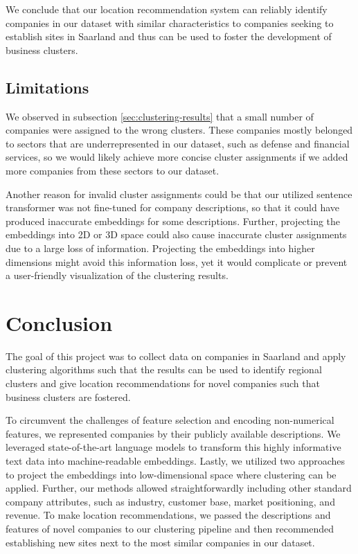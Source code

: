 \documentclass[conference]{IEEEtran}
\begin{document}
We conclude that our location recommendation system can reliably identify companies in our dataset with similar characteristics to companies seeking to establish sites in Saarland and thus can be used to foster the development of business clusters.

\subsection{Limitations}
We observed in subsection \ref{sec:clustering-results} that a small number of companies were assigned to the wrong clusters. These companies mostly belonged to sectors that are underrepresented in our dataset, such as defense and financial services, so we would likely achieve more concise cluster assignments if we added more companies from these sectors to our dataset.

Another reason for invalid cluster assignments could be that our utilized sentence transformer was not fine-tuned for company descriptions, so that it could have produced inaccurate embeddings for some descriptions. Further, projecting the embeddings into 2D or 3D space could also cause inaccurate cluster assignments due to a large loss of information. Projecting the embeddings into higher dimensions might avoid this information loss, yet it would complicate or prevent a user-friendly visualization of the clustering results.

\section{Conclusion}
The goal of this project was to collect data on companies in Saarland and apply clustering algorithms such that the results can be used to identify regional clusters and give location recommendations for novel companies such that business clusters are fostered.

To circumvent the challenges of feature selection and encoding non-numerical features, we represented companies by their publicly available descriptions. We leveraged state-of-the-art language models to transform this highly informative text data into machine-readable embeddings. Lastly, we utilized two approaches to project the embeddings into low-dimensional space where clustering can be applied.
Further, our methods allowed straightforwardly including other standard company attributes, such as industry, customer base, market positioning, and revenue. 
To make location recommendations, we passed the descriptions and features of novel companies to our clustering pipeline and then recommended establishing new sites next to the most similar companies in our dataset.
\end{document}
